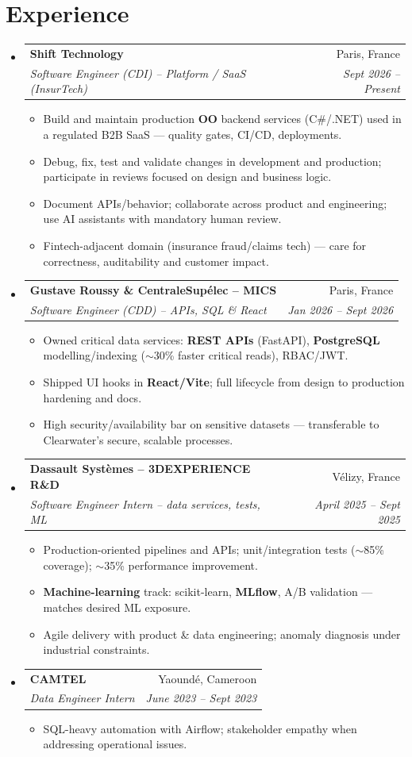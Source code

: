 \documentclass[letterpaper,10.5pt]{article}
\makeatletter
\newcommand{\resumeItem}[1]{\item\small{#1}}
\newcommand{\resumeSubheading}[4]{\vspace{3pt}\item\begin{tabular*}{0.97\textwidth}[t]{l@{\extracolsep{\fill}}r}\textbf{#1}&{#2}\\\textit{\small #3}&\textit{\small #4}\\\end{tabular*}\vspace{1pt}}
\newcommand{\resumeSubHeadingListStart}{\begin{itemize}[leftmargin=0.08in,label={}]}
\newcommand{\resumeSubHeadingListEnd}{\end{itemize}}
\makeatother
\begin{document}
\section{Experience}
\resumeSubHeadingListStart
  \resumeSubheading
    {Shift Technology}{Paris, France}
    {Software Engineer (CDI) -- Platform / SaaS (InsurTech)}{Sept 2026 -- Present}
    \begin{itemize}
      \resumeItem{Build and maintain production \textbf{OO} backend services (C\#/.NET) used in a regulated B2B SaaS --- quality gates, CI/CD, deployments.}
      \resumeItem{Debug, fix, test and validate changes in development and production; participate in reviews focused on design and business logic.}
      \resumeItem{Document APIs/behavior; collaborate across product and engineering; use AI assistants with mandatory human review.}
      \resumeItem{Fintech-adjacent domain (insurance fraud/claims tech) --- care for correctness, auditability and customer impact.}
    \end{itemize}
  \resumeSubheading
    {Gustave Roussy \& CentraleSup\'elec -- MICS}{Paris, France}
    {Software Engineer (CDD) -- APIs, SQL \& React}{Jan 2026 -- Sept 2026}
    \begin{itemize}
      \resumeItem{Owned critical data services: \textbf{REST APIs} (FastAPI), \textbf{PostgreSQL} modelling/indexing ($\sim$30\% faster critical reads), RBAC/JWT.}
      \resumeItem{Shipped UI hooks in \textbf{React/Vite}; full lifecycle from design to production hardening and docs.}
      \resumeItem{High security/availability bar on sensitive datasets --- transferable to Clearwater's secure, scalable processes.}
    \end{itemize}
  \resumeSubheading
    {Dassault Syst\`emes -- 3DEXPERIENCE R\&D}{V\'elizy, France}
    {Software Engineer Intern -- data services, tests, ML}{April 2025 -- Sept 2025}
    \begin{itemize}
      \resumeItem{Production-oriented pipelines and APIs; unit/integration tests ($\sim$85\% coverage); $\sim$35\% performance improvement.}
      \resumeItem{\textbf{Machine-learning} track: scikit-learn, \textbf{MLflow}, A/B validation --- matches desired ML exposure.}
      \resumeItem{Agile delivery with product \& data engineering; anomaly diagnosis under industrial constraints.}
    \end{itemize}
  \resumeSubheading
    {CAMTEL}{Yaound\'e, Cameroon}
    {Data Engineer Intern}{June 2023 -- Sept 2023}
    \begin{itemize}
      \resumeItem{SQL-heavy automation with Airflow; stakeholder empathy when addressing operational issues.}
    \end{itemize}
\resumeSubHeadingListEnd
\end{document}
